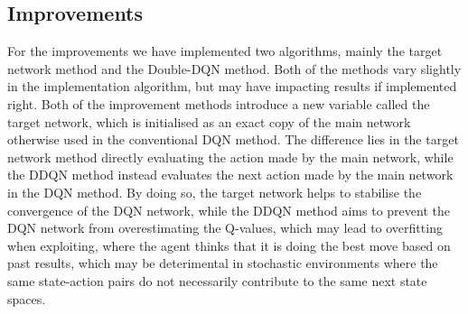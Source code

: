 \subsection{Improvements}
For the improvements we have implemented two algorithms, mainly the target network method and the Double-DQN method. Both of the methods vary slightly in the implementation algorithm, but may have impacting results if implemented right. Both of the improvement methods introduce a new variable called the target network, which is initialised as an exact copy of the main network otherwise used in the conventional DQN method. The difference lies in the target network method directly evaluating the action made by the main network, while the DDQN method instead evaluates the next action made by the main network in the DQN method. By doing so, the target network helps to stabilise the convergence of the DQN network, while the DDQN method aims to prevent the DQN network from overestimating the Q-values, which may lead to overfitting when exploiting, where the agent thinks that it is doing the best move based on past results, which may be deterimental in stochastic environments where the same state-action pairs do not necessarily contribute to the same next state spaces.